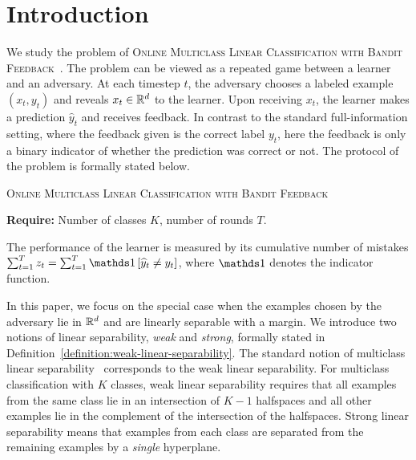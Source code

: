 \section{Introduction}
\label{section:introduction}

We study the problem of \textsc{Online Multiclass Linear Classification with
Bandit Feedback}~\citep{Kakade-Shalev-Shwartz-Tewari-2008}. The problem can be
viewed as a repeated game between a learner and an adversary. At each
timestep $t$, the adversary chooses a labeled example $(x_t, y_t)$ and reveals $x_t\in \mathbb{R}^d$ to the learner.
Upon receiving $x_t$, the learner makes a prediction $\widehat{y}_t$ and receives feedback.
In contrast to the
standard full-information setting, where the feedback given is the correct label
$y_t$, here the feedback is only a binary indicator of whether the prediction
was correct or not. The protocol of the problem is formally stated below.

\begin{protocol}[h]
\caption{\textsc{Online Multiclass Linear Classification with Bandit Feedback}
\label{algorithm:game-protocol}}
\textbf{Require:} Number of classes $K$, number of rounds $T$.\\

\end{protocol}

The performance of the learner is measured by its cumulative number of
mistakes $\sum_{t=1}^T z_t = \sum_{t=1}^T \indicator{\widehat y_t \neq y_t}$,
where $\one$ denotes the indicator function.

In this paper, we focus on the special case when the examples chosen by the
adversary lie in $\mathbb{R}^d$ and are linearly separable with a margin. We introduce
two notions of linear separability, \emph{weak} and \emph{strong}, formally
stated in
Definition~\ref{definition:weak-linear-separability}.
The standard notion of multiclass linear
separability~\citep{Crammer-Singer-2003} corresponds to the weak linear
separability. %
For multiclass classification with $K$ classes, weak linear
separability requires that all examples from the same class lie in an intersection of $K-1$ halfspaces and all other examples lie in the complement of
the intersection of the halfspaces. Strong linear separability means that
examples from each class are separated from the remaining examples by a
\emph{single} hyperplane.

